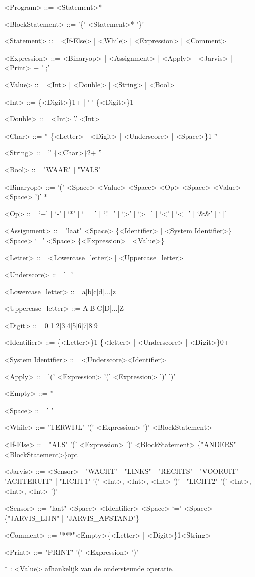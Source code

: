 \documentclass[a4paper]{article}
\begin{document}
\begin{grammar}
	
	<Program> ::= <Statement>*
	
	<BlockStatement> ::= '\{' <Statement>* '\}'
	
	<Statement> ::= <If-Else> | <While> |  <Expression>  | <Comment>
	
	<Expression> ::= <Binaryop> | <Assignment> | <Apply> | <Jarvis> | <Print> + ' ;'
	
	<Value> ::= <Int> | <Double> | <String> | <Bool>
	
	<Int>            ::= \{<Digit>\}{1+} | '-' \{<Digit>\}{1+}
	
	<Double>        ::= <Int> '.' <Int>
	
	<Char> ::= '' \{<Letter> | <Digit> | <Underscore> | <Space>\}{1} ''
	
	<String> ::=  '' \{<Char>\}{2+} ''
	
	<Bool>           ::= "WAAR" | "VALS"
	
	<Binaryop>       ::= '(' <Space>  <Value> <Space>  <Op> <Space>  <Value> <Space>  ')' $\ast$
	
	<Op> ::=  `+' | `-' | `*' | `==' | `!=' | `>' | `>=' | `<' | `<=' | `&&' | `||'
	
	<Assignment> ::= "laat" <Space> \{<Identifier> | <System Identifier>\} <Space> `=' <Space>  \{<Expression> | <Value>\}
	
	<Letter> ::= <Lowercase_letter> | <Uppercase_letter>
	
	<Underscore> ::= '_'
	
	<Lowercase_letter> ::= a|b|c|d|...|z
	
	<Uppercase_letter> ::= A|B|C|D|...|Z
	
	<Digit> ::= 0|1|2|3|4|5|6|7|8|9
	
	<Identifier>     ::=  \{<Letter>\}{1} \{<letter> | <Underscore> | <Digit>\}{0+}
	
	<System Identifier> ::= <Underscore><Identifier>
	
	<Apply>          ::= '(' <Expression> '(' <Expression> ')' ')'
	
	<Empty>          ::= ''
	
	<Space>      ::= ' '
	
	<While>			::= "TERWIJL" 	'(' <Expression> ')'  <BlockStatement>
	
	<If-Else> 		::= "ALS" '(' <Expression> ')' <BlockStatement> \{"ANDERS" <BlockStatement>\}{opt}
	
	<Jarvis>	::= <Sensor> | "WACHT" | "LINKS" | "RECHTS" | "VOORUIT" | "ACHTERUIT" | "LICHT1" '(' <Int>, <Int>, <Int> ')' | "LICHT2" '(' <Int>, <Int>, <Int> ')' 
	
	<Sensor>  ::= "laat" <Space> <Identifier> <Space> `=' <Space>  \{"JARVIS_LIJN" | "JARVIS_AFSTAND"\}
	
	<Comment> ::= "***"<Empty>\{<Letter> | <Digit>\}{1}<String>
	
	<Print> ::= "PRINT" '(' <Expression> ')'
\end{grammar}
	$\ast$ : <Value> afhankelijk van de ondersteunde operatie.
	
\end{document}
